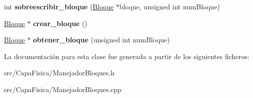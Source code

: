 \begin{DoxyCompactItemize}
\item 
\hypertarget{class_manejador_bloques_a98c9e78eb71991c22ff0ee71d0f961ca}{int {\bfseries sobreescribir\-\_\-bloque} (\hyperlink{class_bloque}{\-Bloque} $\ast$bloque, unsigned int num\-Bloque)}\label{class_manejador_bloques_a98c9e78eb71991c22ff0ee71d0f961ca}

\item 
\hypertarget{class_manejador_bloques_ac3e3ae5335978f84f1900a50552f7487}{\hyperlink{class_bloque}{\-Bloque} $\ast$ {\bfseries crear\-\_\-bloque} ()}\label{class_manejador_bloques_ac3e3ae5335978f84f1900a50552f7487}

\item 
\hypertarget{class_manejador_bloques_a623facc9e80d9be10f047b70e0e05e20}{\hyperlink{class_bloque}{\-Bloque} $\ast$ {\bfseries obtener\-\_\-bloque} (unsigned int num\-Bloque)}\label{class_manejador_bloques_a623facc9e80d9be10f047b70e0e05e20}

\end{DoxyCompactItemize}


\-La documentación para esta clase fue generada a partir de los siguientes ficheros\-:\begin{DoxyCompactItemize}
\item 
src/\-Capa\-Fisica/\-Manejador\-Bloques.\-h\item 
src/\-Capa\-Fisica/\-Manejador\-Bloques.\-cpp\end{DoxyCompactItemize}
